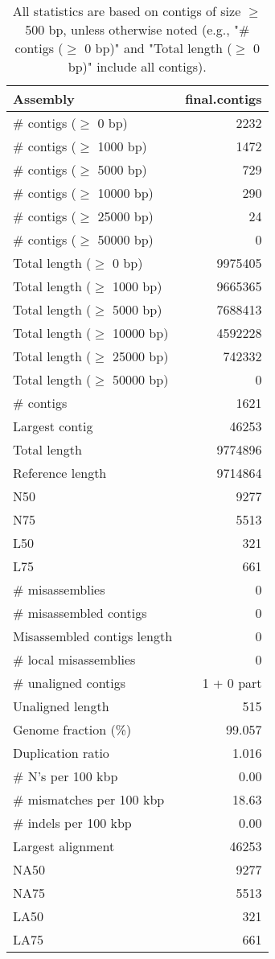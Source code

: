 \documentclass[12pt,a4paper]{article}
\begin{document}
\begin{table}[ht]
\begin{center}
\caption{All statistics are based on contigs of size $\geq$ 500 bp, unless otherwise noted (e.g., "\# contigs ($\geq$ 0 bp)" and "Total length ($\geq$ 0 bp)" include all contigs).}
\begin{tabular}{|l*{1}{|r}|}
\hline
Assembly & final.contigs \\ \hline
\# contigs ($\geq$ 0 bp) & 2232 \\ \hline
\# contigs ($\geq$ 1000 bp) & 1472 \\ \hline
\# contigs ($\geq$ 5000 bp) & 729 \\ \hline
\# contigs ($\geq$ 10000 bp) & 290 \\ \hline
\# contigs ($\geq$ 25000 bp) & 24 \\ \hline
\# contigs ($\geq$ 50000 bp) & 0 \\ \hline
Total length ($\geq$ 0 bp) & 9975405 \\ \hline
Total length ($\geq$ 1000 bp) & 9665365 \\ \hline
Total length ($\geq$ 5000 bp) & 7688413 \\ \hline
Total length ($\geq$ 10000 bp) & 4592228 \\ \hline
Total length ($\geq$ 25000 bp) & 742332 \\ \hline
Total length ($\geq$ 50000 bp) & 0 \\ \hline
\# contigs & 1621 \\ \hline
Largest contig & 46253 \\ \hline
Total length & 9774896 \\ \hline
Reference length & 9714864 \\ \hline
N50 & 9277 \\ \hline
N75 & 5513 \\ \hline
L50 & 321 \\ \hline
L75 & 661 \\ \hline
\# misassemblies & 0 \\ \hline
\# misassembled contigs & 0 \\ \hline
Misassembled contigs length & 0 \\ \hline
\# local misassemblies & 0 \\ \hline
\# unaligned contigs & 1 + 0 part \\ \hline
Unaligned length & 515 \\ \hline
Genome fraction (\%) & 99.057 \\ \hline
Duplication ratio & 1.016 \\ \hline
\# N's per 100 kbp & 0.00 \\ \hline
\# mismatches per 100 kbp & 18.63 \\ \hline
\# indels per 100 kbp & 0.00 \\ \hline
Largest alignment & 46253 \\ \hline
NA50 & 9277 \\ \hline
NA75 & 5513 \\ \hline
LA50 & 321 \\ \hline
LA75 & 661 \\ \hline
\end{tabular}
\end{center}
\end{table}
\end{document}
